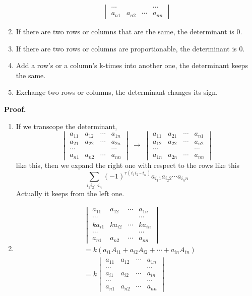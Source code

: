 \documentclass{article}
\theoremstyle{definition}
\begin{document}
\begin{enumerate}
$$\begin{vmatrix}
        \cdots &  &  & \cdots\\
        a_{n1} & a_{n2} & \cdots & a_{nn}
    \end{vmatrix}$$
    \item If there are two rows or columns that are the same, the determinant is 0.
    \item If there are two rows or columns are proportionable, the determinant is 0.
    \item Add a row's or a column's k-times into another one, the determinant keeps the same. 
    \item Exchange two rows or columns, the determinant changes its sign.
\end{enumerate}

\textbf{Proof.}
\begin{enumerate}
    \item 
If we transcope the determinant,
$$
\begin{vmatrix}
    a_{11} & a_{12} & \cdots & a_{1n}\\
    a_{21} & a_{22} & \cdots & a_{2n}\\
    \cdots &  &  & \cdots\\
    a_{n1} & a_{n2} & \cdots & a_{nn}
\end{vmatrix}
\ \rightarrow\ 
\begin{vmatrix}
    a_{11} & a_{21} & \cdots & a_{n1}\\
    a_{12} & a_{22} & \cdots & a_{n2}\\
    \cdots &  &  & \cdots\\
    a_{1n} & a_{2n} & \cdots & a_{nn}
\end{vmatrix}$$
like this, then we expand the right one with respect to the rows like this 
$$ \sum_{i_{1}i_{2}\cdots i_{n}}(-1)^{\tau (i_{1}i_{2}\cdots i_{n})} a_{i_{1}1}a_{i_{2}2}\cdots a_{i_{n}n}$$
Actually it keeps from the left one.\\

\item 
\begin{align*}
&\begin{vmatrix}
    a_{11} & a_{12} & \cdots & a_{1n}\\
    \cdots &  &  & \cdots\\
    ka_{i1} & ka_{i2} & \cdots & ka_{in}\\
    \cdots &  &  & \cdots\\
    a_{n1} & a_{n2} & \cdots & a_{nn}
\end{vmatrix}\\
& = k \left( a_{i1}A_{i1} + a_{i2}A_{i2} + \cdots + a_{in}A_{in} \right) \\
& = k \begin{vmatrix}
    a_{11} & a_{12} & \cdots & a_{1n}\\
    \cdots &  &  & \cdots\\
    a_{i1} & a_{i2} & \cdots & a_{in}\\
    \cdots &  &  & \cdots\\
    a_{n1} & a_{n2} & \cdots & a_{nn}
\end{vmatrix}
\end{align*}


\end{enumerate}
\end{document}
